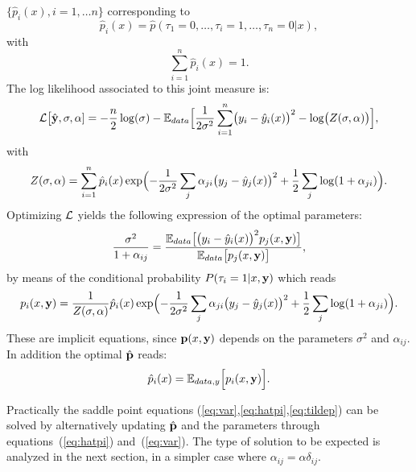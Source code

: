 \documentclass[envcountsect,runningheads]{llncs}
\theoremstyle{etoile}
\begin{document}
$\{\hat p_i(x),i=1,\dots n\}$ corresponding to
\[
\hat p_i(x) = \hat p(\tau_1=0,\ldots,\tau_i=1,\ldots,\tau_n=0\vert x),
\]
with 
\[
\sum_{i=1}^n \hat p_i(x) = 1.
\]
The log likelihood associated to this joint measure is: %
\begin{equation}\label{eq:LL}
{\cal L}\bigl[\hat {\bf y},\sigma,{\bf \alpha}] = -\frac{n}{2}\log(\sigma)-{\mathbb E}_{data}\Bigl[\frac{1}{2\sigma^2}\sum_{i=1}^n\bigl(y_i-\hat y_i(x)\bigr)^2
-\log\bigl(Z(\sigma,{\bf \alpha})\bigr)\Bigr],
\end{equation}
with
\[
Z(\sigma,{\bf \alpha}) = \sum_{i=1}^n\hat p_i(x)\exp\Bigl(-\frac{1}{2\sigma^2}\sum_j\alpha_{ji}\bigl(y_j-\hat y_j(x)\bigr)^2+\frac{1}{2}\sum_j\log(1+\alpha_{ji})\Bigr).
\]
Optimizing ${\cal L}$ yields the following expression of the optimal parameters:
\begin{equation}\label{eq:var}
\frac{\sigma^2}{1+\alpha_{ij}} = \frac{{\mathbb E}_{data}\bigl[\bigl(y_i-\hat y_i(x)\bigr)^2p_j(x,{\bf y})\bigr]}{{\mathbb E}_{data}\bigl[p_j(x,{\bf y})\bigr]},
\end{equation}
by means of the conditional probability $P(\tau_i=1\vert x,{\bf y})$ which reads
\begin{equation}\label{eq:hatpi}
p_i(x,{\bf y}) = \frac{1}{Z(\sigma,{\bf \alpha})}\hat p_i(x)\exp\Bigl(-\frac{1}{2\sigma^2}\sum_j\alpha_{ji}\bigl(y_j-\hat y_j(x)\bigr)^2+\frac{1}{2}\sum_j\log(1+\alpha_{ji})\Bigr).
\end{equation}
These are implicit equations, since ${\bf p}(x,{\bf y})$ depends on the parameters $\sigma^2$ and $\alpha_{ij}$.
In addition the optimal $\hat {\bf p}$ reads:%
\begin{equation}\label{eq:tildep}
\hat p_i(x) = {\mathbb E}_{data,y}\Bigl[p_i(x,{\bf y})\Bigr].
\end{equation}

Practically the saddle point equations (\ref{eq:var},\ref{eq:hatpi},\ref{eq:tildep}) can be solved by alternatively updating $\hat {\bf p}$
and the parameters through equations~(\ref{eq:hatpi}) and~(\ref{eq:var}). The type of solution to be expected is analyzed in the next section,
in a simpler case where $\alpha_{ij} = \alpha\delta_{ij}$.
\end{document}

